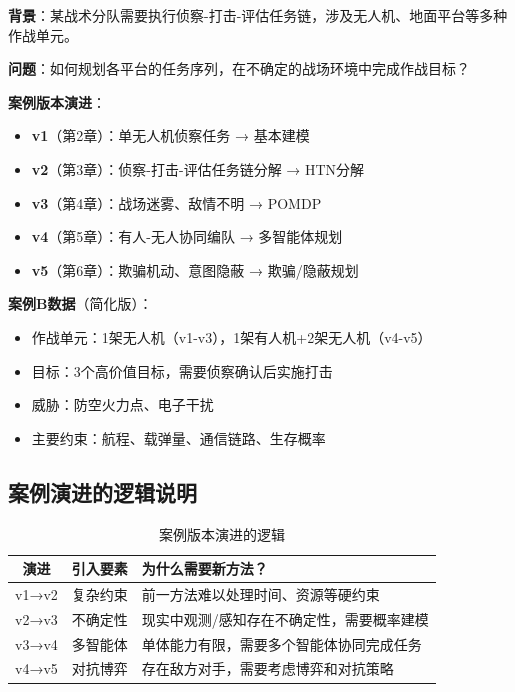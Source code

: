 \begin{caseboxB}
\textbf{背景}：某战术分队需要执行侦察-打击-评估任务链，涉及无人机、地面平台等多种作战单元。

\textbf{问题}：如何规划各平台的任务序列，在不确定的战场环境中完成作战目标？

\textbf{案例版本演进}：
\begin{itemize}
  \item \textbf{v1}（第2章）：单无人机侦察任务 → 基本建模
  \item \textbf{v2}（第3章）：侦察-打击-评估任务链分解 → HTN分解
  \item \textbf{v3}（第4章）：战场迷雾、敌情不明 → POMDP
  \item \textbf{v4}（第5章）：有人-无人协同编队 → 多智能体规划
  \item \textbf{v5}（第6章）：欺骗机动、意图隐蔽 → 欺骗/隐蔽规划
\end{itemize}
\end{caseboxB}

\textbf{案例B数据}（简化版）：
\begin{itemize}[leftmargin=2em]
  \item 作战单元：1架无人机（v1-v3），1架有人机+2架无人机（v4-v5）
  \item 目标：3个高价值目标，需要侦察确认后实施打击
  \item 威胁：防空火力点、电子干扰
  \item 主要约束：航程、载弹量、通信链路、生存概率
\end{itemize}

\subsection{案例演进的逻辑说明}

\begin{table}[htbp]
\centering
\caption{案例版本演进的逻辑}
\begin{tabular}{ccp{8cm}}
\toprule
\textbf{演进} & \textbf{引入要素} & \textbf{为什么需要新方法？} \\
\midrule
v1→v2 & 复杂约束 & 前一方法难以处理时间、资源等硬约束 \\
v2→v3 & 不确定性 & 现实中观测/感知存在不确定性，需要概率建模 \\
v3→v4 & 多智能体 & 单体能力有限，需要多个智能体协同完成任务 \\
v4→v5 & 对抗博弈 & 存在敌方对手，需要考虑博弈和对抗策略 \\
\bottomrule
\end{tabular}
\end{table}

